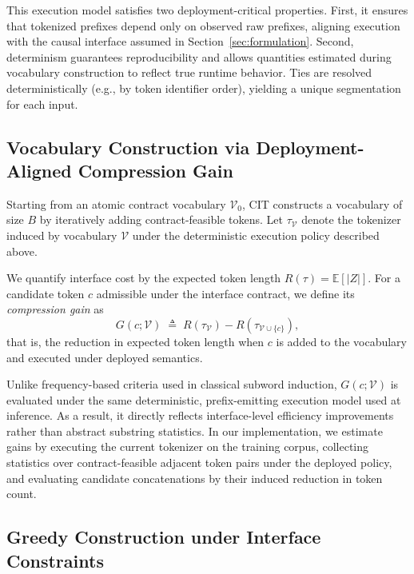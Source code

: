 This execution model satisfies two deployment-critical properties.
First, it ensures that tokenized prefixes depend only on observed raw prefixes, aligning execution with the causal interface assumed in Section~\ref{sec:formulation}.
Second, determinism guarantees reproducibility and allows quantities estimated during vocabulary construction to reflect true runtime behavior.
Ties are resolved deterministically (e.g., by token identifier order), yielding a unique segmentation for each input.

\subsection{Vocabulary Construction via Deployment-Aligned Compression Gain}
\label{sec:construction}

Starting from an atomic contract vocabulary $\mathcal{V}_0$, CIT constructs a vocabulary of size $B$ by iteratively adding contract-feasible tokens.
Let $\tau_{\mathcal{V}}$ denote the tokenizer induced by vocabulary $\mathcal{V}$ under the deterministic execution policy described above.

We quantify interface cost by the expected token length $R(\tau)=\mathbb{E}[|Z|]$.
For a candidate token $c$ admissible under the interface contract, we define its \emph{compression gain} as
\begin{equation}
G(c;\mathcal{V})
\;\triangleq\;
R(\tau_{\mathcal{V}}) - R(\tau_{\mathcal{V}\cup\{c\}}),
\label{eq:gain_def}
\end{equation}
that is, the reduction in expected token length when $c$ is added to the vocabulary and executed under deployed semantics.

Unlike frequency-based criteria used in classical subword induction, $G(c;\mathcal{V})$ is evaluated under the same deterministic, prefix-emitting execution model used at inference.
As a result, it directly reflects interface-level efficiency improvements rather than abstract substring statistics.
In our implementation, we estimate gains by executing the current tokenizer on the training corpus, collecting statistics over contract-feasible adjacent token pairs under the deployed policy, and evaluating candidate concatenations by their induced reduction in token count.

\subsection{Greedy Construction under Interface Constraints}
\label{sec:greedy}


